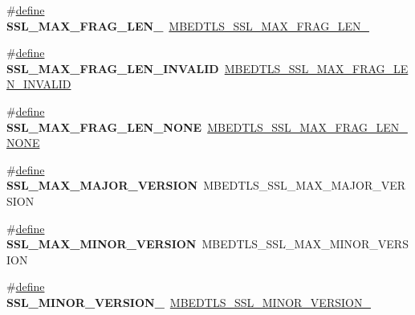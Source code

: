 \begin{DoxyCompactItemize}
\item 
\mbox{\label{compat-1_83_8h_a6bf67eb19ce0cebd6592ac5cba5c2411}} 
\#\hyperlink{structdefine}{define} {\bfseries S\+S\+L\+\_\+\+M\+A\+X\+\_\+\+F\+R\+A\+G\+\_\+\+L\+E\+N\+\_}~\hyperlink{ssl_8h_a148f83e96299be6220fc3c922cfb58d5}{M\+B\+E\+D\+T\+L\+S\+\_\+\+S\+S\+L\+\_\+\+M\+A\+X\+\_\+\+F\+R\+A\+G\+\_\+\+L\+E\+N\+\_}
\item 
\mbox{\label{compat-1_83_8h_acb1200880a9fc9fea4c776242d246cb1}} 
\#\hyperlink{structdefine}{define} {\bfseries S\+S\+L\+\_\+\+M\+A\+X\+\_\+\+F\+R\+A\+G\+\_\+\+L\+E\+N\+\_\+\+I\+N\+V\+A\+L\+ID}~\hyperlink{ssl_8h_a256731a4bb52bb1960cc88ec4f350926}{M\+B\+E\+D\+T\+L\+S\+\_\+\+S\+S\+L\+\_\+\+M\+A\+X\+\_\+\+F\+R\+A\+G\+\_\+\+L\+E\+N\+\_\+\+I\+N\+V\+A\+L\+ID}
\item 
\mbox{\label{compat-1_83_8h_a1e3348879ac88b7bb93b5d503c05e13c}} 
\#\hyperlink{structdefine}{define} {\bfseries S\+S\+L\+\_\+\+M\+A\+X\+\_\+\+F\+R\+A\+G\+\_\+\+L\+E\+N\+\_\+\+N\+O\+NE}~\hyperlink{ssl_8h_a952256aaeb342b5f8cb55fb39891b235}{M\+B\+E\+D\+T\+L\+S\+\_\+\+S\+S\+L\+\_\+\+M\+A\+X\+\_\+\+F\+R\+A\+G\+\_\+\+L\+E\+N\+\_\+\+N\+O\+NE}
\item 
\mbox{\label{compat-1_83_8h_ab9777574c0f3b3d13e5c4e00981b7834}} 
\#\hyperlink{structdefine}{define} {\bfseries S\+S\+L\+\_\+\+M\+A\+X\+\_\+\+M\+A\+J\+O\+R\+\_\+\+V\+E\+R\+S\+I\+ON}~M\+B\+E\+D\+T\+L\+S\+\_\+\+S\+S\+L\+\_\+\+M\+A\+X\+\_\+\+M\+A\+J\+O\+R\+\_\+\+V\+E\+R\+S\+I\+ON
\item 
\mbox{\label{compat-1_83_8h_a74783bb987193059554331dba3b553ab}} 
\#\hyperlink{structdefine}{define} {\bfseries S\+S\+L\+\_\+\+M\+A\+X\+\_\+\+M\+I\+N\+O\+R\+\_\+\+V\+E\+R\+S\+I\+ON}~M\+B\+E\+D\+T\+L\+S\+\_\+\+S\+S\+L\+\_\+\+M\+A\+X\+\_\+\+M\+I\+N\+O\+R\+\_\+\+V\+E\+R\+S\+I\+ON
\item 
\mbox{\label{compat-1_83_8h_a4fedd81485a2c0a99b8d0d1dea245302}} 
\#\hyperlink{structdefine}{define} {\bfseries S\+S\+L\+\_\+\+M\+I\+N\+O\+R\+\_\+\+V\+E\+R\+S\+I\+O\+N\+\_}~\hyperlink{ssl_8h_a29f89cb1c3fa78a8c57f683495feff15}{M\+B\+E\+D\+T\+L\+S\+\_\+\+S\+S\+L\+\_\+\+M\+I\+N\+O\+R\+\_\+\+V\+E\+R\+S\+I\+O\+N\+\_}
\item 
\mbox{\label{compat-1_83_8h_a3e0c978697874bb5457d61f7515e8f55}} 

\end{DoxyCompactItemize}

